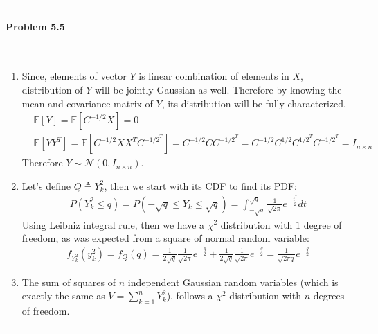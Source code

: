\documentclass[12pt, letterpaper]{scrartcl}
\begin{document}
\hrule

\paragraph*{Problem 5.5} \hfill\\
\begin{enumerate}[((a))]
    \item Since, elements of vector $Y$ is linear combination of elements in $X$, distribution of $Y$ will be jointly Gaussian as well. Therefore by knowing the mean and covariance matrix of $Y$, its distribution will be fully characterized.
    \begin{align*}
        &\mathbb{E}[Y]=\mathbb{E}[C^{-1/2}X]=0\\
        &\mathbb{E}[YY^T]=\mathbb{E}[C^{-1/2}XX^TC^{{-1/2}^T}]=C^{-1/2}CC^{{-1/2}^T}=C^{-1/2}C^{1/2}C^{{1/2}^T}C^{{-1/2}^T}=I_{n\times n}
    \end{align*}
    Therefore $Y\sim\mathcal{N}(0, I_{n\times n})$.
    
    \item Let's define $Q\triangleq Y_k^2$, then we start with its CDF to find its PDF:
    \begin{align*}
        P(Y_k^2\leq q)=P(-\sqrt{q}\leq Y_k\leq \sqrt{q})=\int^{\sqrt{q}}_{-\sqrt{q}}\frac{1}{\sqrt{2\pi}}e^{-\frac{t^2}{2}}dt
    \end{align*}
    Using Leibniz integral rule, then we have a $\chi^2$ distribution with $1$ degree of freedom, as was expected from a square of normal random variable:
    \begin{align*}
        f_{Y_k^2}(y_k^2)=f_Q(q)=\frac{1}{2\sqrt{q}}\frac{1}{\sqrt{2\pi}}e^{-\frac{q}{2}}+\frac{1}{2\sqrt{q}}\frac{1}{\sqrt{2\pi}}e^{-\frac{q}{2}}=\frac{1}{\sqrt{2\pi q}}e^{-\frac{q}{2}}
    \end{align*}
    \item
    The sum of squares of $n$ independent Gaussian random variables (which is exactly the same as $V=\sum^n_{k=1}Y_k^2$), follows a $\chi^2$ distribution with $n$ degrees of freedom.
\end{enumerate}
\hrule
\end{document}
